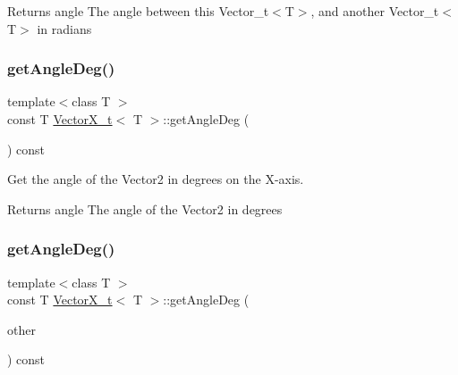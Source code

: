\begin{DoxyReturn}{Returns}
angle The angle between this Vector\+\_\+t$<$\+T$>$, and another Vector\+\_\+t$<$\+T$>$ in radians 
\end{DoxyReturn}
\mbox{\label{class_vector_x__t_abdee14870829077f912a2e5b85ceb51a}} 
\subsubsection{\texorpdfstring{get\+Angle\+Deg()}{getAngleDeg()}\hspace{0.1cm}{\footnotesize\ttfamily [1/2]}}
{\footnotesize\ttfamily template$<$class T $>$ \\
const T \hyperlink{class_vector_x__t}{Vector\+X\+\_\+t}$<$ T $>$\+::get\+Angle\+Deg (\begin{DoxyParamCaption}{ }\end{DoxyParamCaption}) const}



Get the angle of the Vector2 in degrees on the X-\/axis. 

\begin{DoxyReturn}{Returns}
angle The angle of the Vector2 in degrees 
\end{DoxyReturn}
\mbox{\label{class_vector_x__t_a936a9063f46982c8837b88c6a16526bf}} 
\subsubsection{\texorpdfstring{get\+Angle\+Deg()}{getAngleDeg()}\hspace{0.1cm}{\footnotesize\ttfamily [2/2]}}
{\footnotesize\ttfamily template$<$class T $>$ \\
const T \hyperlink{class_vector_x__t}{Vector\+X\+\_\+t}$<$ T $>$\+::get\+Angle\+Deg (\begin{DoxyParamCaption}\item[{const \hyperlink{class_vector_x__t}{Vector\+X\+\_\+t}$<$ T $>$ \&}]{other }\end{DoxyParamCaption}) const}



